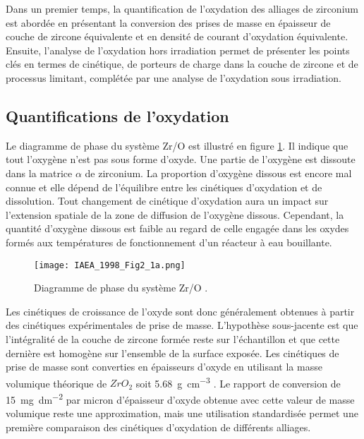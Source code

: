 \begin{refsection}
    Dans un premier temps, la quantification de l'oxydation des alliages de zirconium est abordée en présentant la
    conversion des prises de masse en épaisseur de couche de zircone équivalente et en densité de courant d'oxydation équivalente. 
    Ensuite, l'analyse de l'oxydation hors irradiation
    permet de présenter les points clés en termes de cinétique, de porteurs de charge dans la couche de zircone et de
    processus limitant, complétée par une analyse de l'oxydation sous irradiation.

    \subsection{Quantifications de l'oxydation}\label{subsec:oxidation_introduction}


    Le diagramme de phase du système Zr/O est illustré en figure \ref{fig:ZrO_thermodynamics}. Il
    indique que tout l'oxygène n'est pas sous forme d'oxyde. Une partie de l'oxygène est dissoute
    dans la matrice $\alpha$ de zirconium. La proportion d'oxygène dissous est encore mal connue et elle dépend de
    l'équilibre entre les cinétiques d'oxydation et de dissolution. Tout changement de cinétique
    d'oxydation aura un impact sur l'extension spatiale de la zone de diffusion de l'oxygène dissous.
    Cependant, la quantité d'oxygène dissous est faible au regard de celle engagée dans les oxydes formés aux
    températures de fonctionnement d'un réacteur à eau bouillante.

    \begin{figure}[H]
    \centering
    \texttt{[image: IAEA\_1998\_Fig2\_1a.png]}
    \caption[Diagramme de phase du système ZrO/O]{Diagramme de phase du système Zr/O \citep{IAEA1998}.}
    \label{fig:ZrO_thermodynamics}
    \end{figure}

    Les cinétiques de croissance de l'oxyde sont donc généralement obtenues à partir des cinétiques expérimentales de prise de masse. L'hypothèse
    sous-jacente est que l'intégralité de la couche de zircone formée reste sur l'échantillon et que cette dernière est
    homogène sur l'ensemble de la surface exposée. Les cinétiques de prise de 
    masse sont converties en épaisseurs d'oxyde en utilisant la masse volumique théorique de $ZrO_2$ soit 
    \SI{5.68}{\gram\per\cubic\centi\meter} \citep{Lide2003}.
    Le rapport de conversion de
    \SI{15}{\milli\gram\per\square\deci\meter} par micron d'épaisseur d'oxyde obtenue avec cette valeur de masse volumique
    reste une approximation, mais une utilisation standardisée permet  une première comparaison des
    cinétiques d'oxydation de différents alliages.


\end{refsection}
